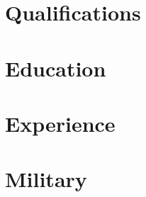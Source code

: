 

    \makecvtitlebox
    \section{Qualifications}
        
    \section{Education}
        
    \section{Experience}
        
    \section{Military}

